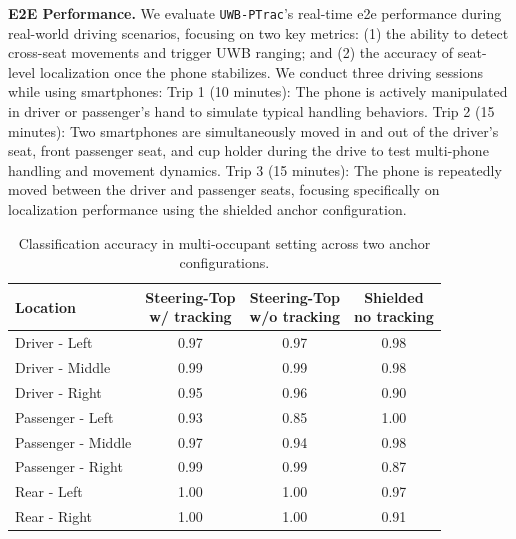 \documentclass[sigconf]{acmart}
\newcommand{\name}{{{\tt UWB-PTrac}}}
\newcommand{\vp}{\vspace{-1.5em}}
\begin{document}
\textbf{E2E Performance.} 
We evaluate \name's  real-time e2e performance during real-world driving scenarios, focusing on two key metrics:
(1) the ability to detect cross-seat movements and trigger UWB ranging; and
(2) the accuracy of seat-level localization once the phone stabilizes.
%
We conduct three driving sessions while using smartphones:
Trip 1 (10 minutes): The phone is actively manipulated in driver or passenger's hand to simulate typical handling behaviors.
%
Trip 2 (15 minutes): Two smartphones are simultaneously moved in and out of the driver’s seat, front passenger seat, and cup holder during the drive to test multi-phone handling and movement dynamics.
%
Trip 3 (15 minutes): The phone is repeatedly moved between the driver and passenger seats, focusing specifically on localization performance using the shielded anchor configuration.
%


\begin{table}[t]
\centering
\small
\caption{Classification accuracy in multi-occupant setting across two anchor configurations.}
\label{tab:multi_occupant_comparison}
\setlength{\tabcolsep}{4pt}
\vp
\begin{tabular}{|l|c|c|c|}
\hline
\textbf{Location} & \makecell[c]{Steering-Top \\ w/ tracking} & \makecell[c]{Steering-Top \\ w/o tracking} & \makecell[c]{Shielded \\ no tracking} \\ \hline
Driver - Left & 0.97 & 0.97 & 0.98 \\
Driver - Middle & 0.99 & 0.99 & 0.98 \\
Driver - Right & 0.95 & 0.96 & 0.90 \\ \hline
Passenger - Left & 0.93 & 0.85 & 1.00 \\
Passenger - Middle & 0.97 & 0.94 & 0.98 \\
Passenger - Right & 0.99 & 0.99 & 0.87 \\ \hline
Rear - Left & 1.00 & 1.00 & 0.97 \\
Rear - Right & 1.00 & 1.00 & 0.91 \\ \hline
\end{tabular}
\vspace{-2em}
\end{table}
\end{document}
